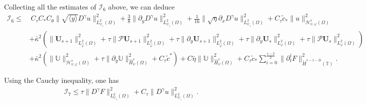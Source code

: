 \documentclass{amsart}
\numberwithin{equation}{section}
\newcommand\y{{{\langle y \rangle}}}
\begin{document}
Collecting all the estimates of $\mathcal{I}_{6}$ above, we can deduce
\begin{align*}
\mathcal{I}_{6}
\leq&~C_{\tau}C_{*}C_{\theta}\|\sqrt{\y}D^{\gamma}u\|_{L_{\psi_{\gamma}}^{2}(\Omega)}^{2}
     +\frac{3}{8}\|\partial_{y}D^{\gamma}u\|_{L_{\psi_{\gamma}}^{2}(\Omega)}^{2}
     +\frac{1}{16}\|\sqrt{\eta}\partial_{x}D^{\gamma}u\|_{L_{\psi_{\gamma}}^{2}(\Omega)}^{2}
     +C_{\tau}\tilde{c}_{*}\|u\|_{\mathcal{H}_{\psi,\varphi}^{s}(\Omega)}^{2}\\
    &+\bar{\kappa}^{2}\left(\|\mathbf{U}_{s+1}\|_{L_{\hat{\varphi}}^{2}(\Omega)}^{2}
                     +\tau\|\mathcal{P}\mathbf{U}_{s+1}\|_{L_{\hat{\varphi}}^{2}(\Omega)}^{2}
                     +\tau\|\partial_{y}\mathbf{U}_{s+1}\|_{L_{\hat{\varphi}}^{2}(\Omega)}^{2}
                     +\tau\|\partial_{y}\mathbf{U}_{s}\|_{L_{\varphi}^{2}(\Omega)}^{2}
                     +\tau\|\mathcal{P}\mathbf{U}_{s}\|_{L_{\varphi}^{2}(\Omega)}^{2}\right)\\
    &+\bar{\kappa}^{2}\left(\|\mathbb{U}\|_{\mathcal{H}_{\psi,\varphi}^{s}(\Omega)}^{2}
                +\tau\|\partial_{y}\mathbb{U}\|_{\hat{H}_{\psi}^{s}(\Omega)}^{2}
                +C_{\tau}\tilde{c}^{*}\right)
     +C\bar{\eta}\|\mathbb{U}\|_{\hat{H}_{\psi}^{s}(\Omega)}^{2}
     +C_{\tau}\tilde{c}_{*}\sum_{i=0}^{\frac{s-3}{2}}\|\partial_{t}^{i}F\|_{\mathring{H}^{s-1-2i}(\mathbb{T})}^{2}.
\end{align*}

 Using the Cauchy inequality, one has
\begin{align*}
\mathcal{I}_{7}\leq \tau\|D^{\gamma}F\|_{L_{\psi_{\gamma}}^{2}(\Omega)}^{2}+C_{\tau}\|D^{\gamma}u\|_{L_{\psi_{\gamma}}^{2}(\Omega)}^{2}.
\end{align*}
\end{document}
